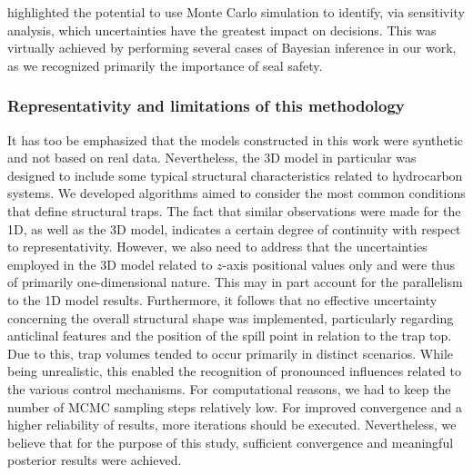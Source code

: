 	\citet{bratvold2010making} highlighted the potential to use Monte Carlo simulation to identify, via sensitivity analysis, which uncertainties have the greatest impact on decisions. This was virtually achieved by performing several cases of Bayesian inference in our work, as we recognized primarily the importance of seal safety.		
	\subsubsection{Representativity and limitations of this methodology}
	It has too be emphasized that the models constructed in this work were synthetic and not based on real data. Nevertheless, the 3D model in particular was designed to include some typical structural characteristics related to hydrocarbon systems. We developed algorithms aimed to consider the most common conditions that define structural traps. The fact that similar observations were made for the 1D, as well as the 3D model, indicates a certain degree of continuity with respect to representativity. However, we also need to address that the uncertainties employed in the 3D model related to $z$-axis positional values only and were thus of primarily one-dimensional nature. This may in part account for the parallelism to the 1D model results. Furthermore, it follows that no effective uncertainty concerning the overall structural shape was implemented, particularly regarding anticlinal features and the position of the spill point in relation to the trap top. Due to this, trap volumes tended to occur primarily in distinct scenarios. While being unrealistic, this enabled the recognition of pronounced influences related to the various control mechanisms. For computational reasons, we had to keep the number of MCMC sampling steps relatively low. For improved convergence and a higher reliability of results, more iterations should be executed. Nevertheless, we believe that for the purpose of this study, sufficient convergence and meaningful posterior results were achieved.\\	
